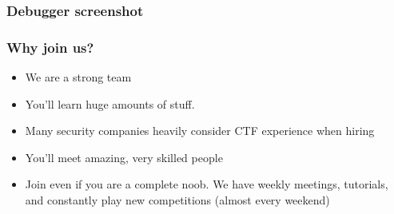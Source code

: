 \documentclass[aspectratio=169]{beamer}
\begin{document}
\begin{frame}
	\frametitle{Debugger screenshot}
	\begin{center}
	\end{center}
\end{frame}


\begin{frame}
	\frametitle{Why join us?}
	\begin{itemize}
		\item We are a strong team
		\item You'll learn huge amounts of stuff.
		\item Many security companies heavily consider CTF experience when hiring
		\item You'll meet amazing, very skilled people
		\item Join even if you are a complete noob. We have weekly meetings, tutorials, and constantly play new competitions (almost every weekend)
	\end{itemize}
\end{frame}
\end{document}
